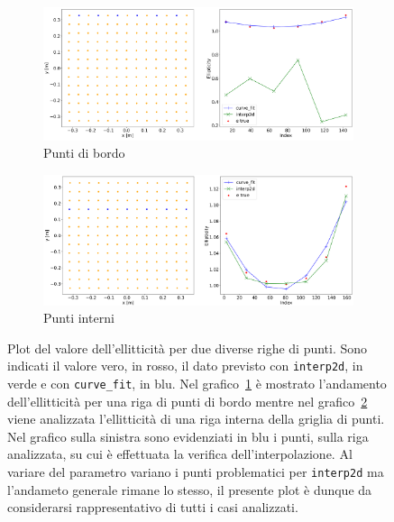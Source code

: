 \documentclass[12pt,a4paper,final]{book}
\begin{document}
\begin{figure}[!ht]
\centering
	\begin{subfigure}{\textwidth}
	    \centering
	    \includegraphics[width=\linewidth]{../figures/row_bordo.png}
	    \caption{Punti di bordo}
	    \label{plot_row_bordo}
	\end{subfigure}
\newline
	\begin{subfigure}{\textwidth}
		\centering
	    \includegraphics[width=\linewidth]{../figures/row_interno.png}
		\caption{Punti interni}
		\label{plot_row_interno}
	\end{subfigure}
	\caption{Plot del valore dell'ellitticità per due diverse righe di punti. Sono indicati il valore vero, in rosso, il dato previsto con \texttt{interp2d}, in verde e con \texttt{curve\_fit}, in blu. Nel grafico~\ref{plot_row_bordo} è mostrato l'andamento dell'ellitticità per una riga di punti di bordo mentre nel grafico~\ref{plot_row_interno} viene analizzata l'ellitticità di una riga interna della griglia di punti. Nel grafico sulla sinistra sono evidenziati in blu i punti, sulla riga analizzata, su cui è effettuata la verifica dell'interpolazione. Al variare del parametro variano i punti problematici per \texttt{interp2d} ma l'andameto generale rimane lo stesso, il presente plot è dunque da considerarsi rappresentativo di tutti i casi analizzati.}
	\label{plot_row}
\end{figure}
\end{document}
